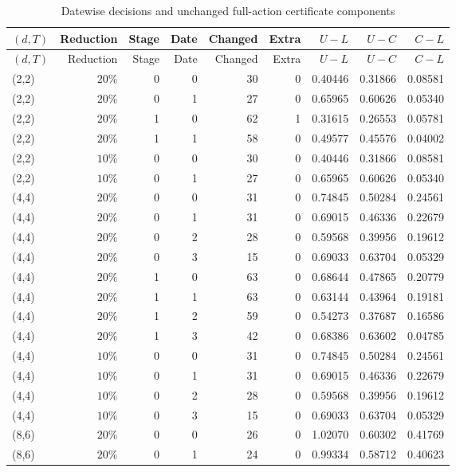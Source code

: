\begingroup\footnotesize\setlength{\tabcolsep}{3pt}
\begin{longtable}{lrrrrrrrr}
\caption{Datewise decisions and unchanged full-action certificate components}\label{tab:datewise59}\\
\hline
$(d,T)$ & Reduction & Stage & Date & Changed & Extra & $U-L$ & $U-C$ & $C-L$ \\
\hline
\endfirsthead
$(d,T)$ & Reduction & Stage & Date & Changed & Extra & $U-L$ & $U-C$ & $C-L$ \\
\hline
\endhead
(2,2) & $20\%$ & 0 & 0 & 30 & 0 & 0.40446 & 0.31866 & 0.08581 \\
(2,2) & $20\%$ & 0 & 1 & 27 & 0 & 0.65965 & 0.60626 & 0.05340 \\
(2,2) & $20\%$ & 1 & 0 & 62 & 1 & 0.31615 & 0.26553 & 0.05781 \\
(2,2) & $20\%$ & 1 & 1 & 58 & 0 & 0.49577 & 0.45576 & 0.04002 \\
(2,2) & $10\%$ & 0 & 0 & 30 & 0 & 0.40446 & 0.31866 & 0.08581 \\
(2,2) & $10\%$ & 0 & 1 & 27 & 0 & 0.65965 & 0.60626 & 0.05340 \\
(4,4) & $20\%$ & 0 & 0 & 31 & 0 & 0.74845 & 0.50284 & 0.24561 \\
(4,4) & $20\%$ & 0 & 1 & 31 & 0 & 0.69015 & 0.46336 & 0.22679 \\
(4,4) & $20\%$ & 0 & 2 & 28 & 0 & 0.59568 & 0.39956 & 0.19612 \\
(4,4) & $20\%$ & 0 & 3 & 15 & 0 & 0.69033 & 0.63704 & 0.05329 \\
(4,4) & $20\%$ & 1 & 0 & 63 & 0 & 0.68644 & 0.47865 & 0.20779 \\
(4,4) & $20\%$ & 1 & 1 & 63 & 0 & 0.63144 & 0.43964 & 0.19181 \\
(4,4) & $20\%$ & 1 & 2 & 59 & 0 & 0.54273 & 0.37687 & 0.16586 \\
(4,4) & $20\%$ & 1 & 3 & 42 & 0 & 0.68386 & 0.63602 & 0.04785 \\
(4,4) & $10\%$ & 0 & 0 & 31 & 0 & 0.74845 & 0.50284 & 0.24561 \\
(4,4) & $10\%$ & 0 & 1 & 31 & 0 & 0.69015 & 0.46336 & 0.22679 \\
(4,4) & $10\%$ & 0 & 2 & 28 & 0 & 0.59568 & 0.39956 & 0.19612 \\
(4,4) & $10\%$ & 0 & 3 & 15 & 0 & 0.69033 & 0.63704 & 0.05329 \\
(8,6) & $20\%$ & 0 & 0 & 26 & 0 & 1.02070 & 0.60302 & 0.41769 \\
(8,6) & $20\%$ & 0 & 1 & 24 & 0 & 0.99334 & 0.58712 & 0.40623 \\

\end{longtable}
